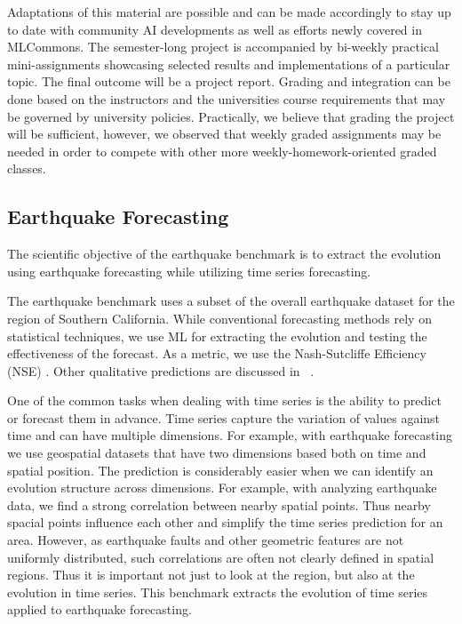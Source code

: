 \documentclass[utf8]{FrontiersinVancouver} %
\begin{document}
 Adaptations of this material are possible and can be made accordingly
 to stay up to date with community AI developments as well as efforts
 newly covered in MLCommons. The semester-long project is accompanied
 by bi-weekly practical mini-assignments showcasing selected results
 and implementations of a particular topic. The final outcome will be a project report. Grading and integration can be done based on the instructors and the universities course requirements that may be governed by university policies. Practically, we believe that grading the project will be sufficient, however, we observed that weekly graded assignments may be needed in order to compete with other more weekly-homework-oriented graded classes.


\subsection{Earthquake Forecasting}
\label{sec:eq}

The scientific objective of the earthquake benchmark is to extract the
evolution using earthquake forecasting while utilizing time series
forecasting.

The earthquake benchmark uses a subset of the overall earthquake
dataset for the region of Southern California. While conventional
forecasting methods rely on statistical techniques, we use ML for
extracting the evolution and testing the effectiveness of the
forecast.  As a metric, we use the Nash-Sutcliffe Efficiency (NSE)
\citep{nash-79}.  Other qualitative predictions are discussed in
~\citep{fox2022-jm}.

One of the common tasks when dealing with time series is the ability
to predict or forecast them in advance. Time series capture the
variation of values against time and can have multiple dimensions. For
example, with earthquake forecasting we use geospatial datasets that
have two dimensions based both on time and spatial position. The
prediction is considerably easier when we can identify an evolution
structure across dimensions. For example, with analyzing earthquake data, we find a
strong correlation between nearby spatial points. Thus nearby
spacial points influence each other and simplify the time series
prediction for an area. However, as earthquake faults and other
geometric features are not uniformly distributed, such correlations
are often not clearly defined in spatial regions. Thus it is important
not just to look at the region, but also at the evolution in time
series. This benchmark extracts the evolution of time series applied
to earthquake forecasting.
\end{document}
